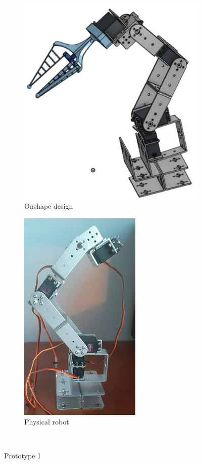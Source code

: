 \begin{figure}[H]
    \begin{subfigure}{.5\linewidth}
        \centering
        \includegraphics[scale = 0.2]{Images/Section03/prototype_onshape1.png}
        \caption{Onshape design}
        \label{fig:Onshape1}
    \end{subfigure}%
    \begin{subfigure}{.5\linewidth}
        \centering
        \includegraphics[scale = 0.3]{Images/Section03/prototype1.png}
        \caption{Physical robot}
        \label{fig:Physical1}
    \end{subfigure}\\[1ex]
    \caption{Prototype 1}
    \label{fig:Prototype1}
\end{figure}

